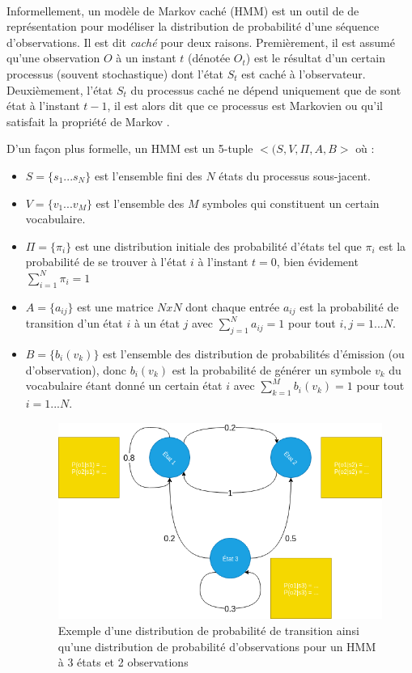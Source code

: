 	\paragraph{}
	Informellement, un modèle de Markov caché (HMM) est un outil de de représentation pour modéliser la distribution de probabilité d'une séquence d'observations. Il est dit \textit{caché} pour deux raisons. Premièrement, il est assumé qu'une observation $O$ à un instant $t$ (dénotée $O_t$)  est le résultat d'un certain processus (souvent stochastique) dont l'état $S_t$ est caché à l'observateur. Deuxièmement, l'état $S_t$ du processus caché ne dépend uniquement que de sont état à l'instant $t-1$, il est alors dit que ce processus est Markovien ou qu'il satisfait la propriété de Markov \cite{hmm_intro}\cite{markov_process}.
	\par D'un façon plus formelle, un HMM est un 5-tuple $<(S,V,\Pi,A,B>$ \cite{hmm_formal} où :
	\begin{itemize}
		\item $S = \lbrace s_1 ... s_N \rbrace$ est l'ensemble fini des $N$ états du processus sous-jacent.
		\item $V = \lbrace v_1 ... v_M \rbrace$ est l'ensemble des $M$ symboles qui constituent un certain vocabulaire.
		\item $\Pi = \lbrace \pi_i \rbrace$ est une distribution initiale des probabilité d'états tel que $\pi_i$ est la probabilité de se trouver à l'état $i$ à l'instant $t=0$, bien évidement $\sum_{i=1}^{N} \pi_i = 1$ 
		\item $A=\lbrace a_{ij} \rbrace$ est une matrice $NxN$ dont chaque entrée $a_{ij}$ est la probabilité de transition d'un état $i$ à un état $j$ avec $\sum_{j=1}^{N} a_{ij} = 1$ pour tout $i,j = 1...N$.
		\item $B=\lbrace b_i(v_k)\rbrace$ est l'ensemble des distribution de probabilités d'émission (ou d'observation), donc $b_i(v_k)$ est la probabilité de générer un symbole $v_k$ du vocabulaire étant donné un certain état $i$ avec $\sum_{k=1}^{M} b_{i}(v_k) = 1$ pour tout $i= 1...N$. 
		
		\begin{figure}[H]
			\centering
			\includegraphics[width=0.65\linewidth]{images/notions/hmm.png}
			\caption{Exemple d'une distribution de probabilité de transition ainsi qu'une distribution de probabilité d'observations pour un HMM à 3 états et 2 observations }
			\label{hmm_process}
		\end{figure}
	\end{itemize}
